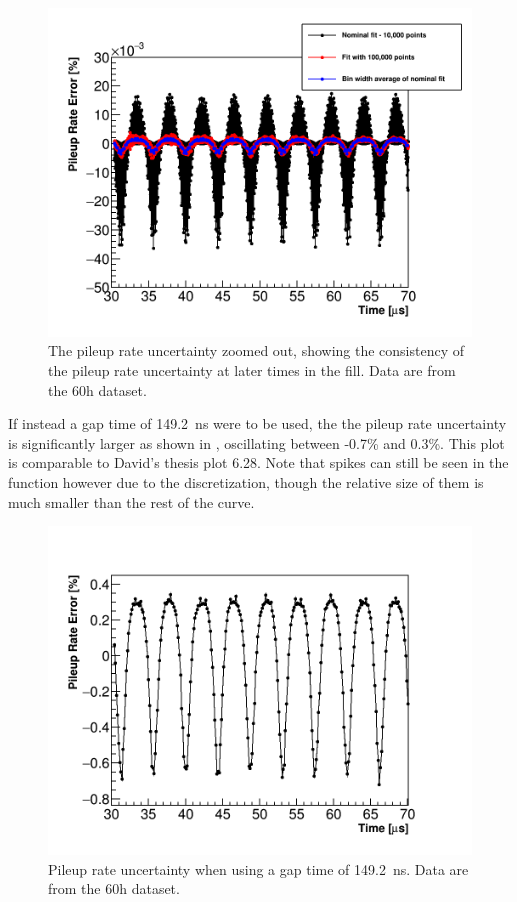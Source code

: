 \begin{figure}
    \centering
    \includegraphics[width=.8\textwidth]{PileupRateError_ZoomedOut}
    \caption[]{The pileup rate uncertainty zoomed out, showing the consistency of the pileup rate uncertainty at later times in the fill. Data are from the 60h dataset.}
    \label{fig:pileupRateErrorZoomed}
\end{figure}

If instead a gap time of \SI{149.2}{\ns} were to be used, the the pileup rate uncertainty is significantly larger as shown in , oscillating between -0.7\% and 0.3\%. This plot is comparable to David's thesis plot 6.28. Note that spikes can still be seen in the function however due to the discretization, though the relative size of them is much smaller than the rest of the curve.


\begin{figure}
    \centering
    \includegraphics[width=.8\textwidth]{PileupRateError_149p2SGT}
    \caption[]{Pileup rate uncertainty when using a gap time of \SI{149.2}{\ns}. Data are from the 60h dataset.}
    \label{fig:pileupRateErrorLarger}
\end{figure}




